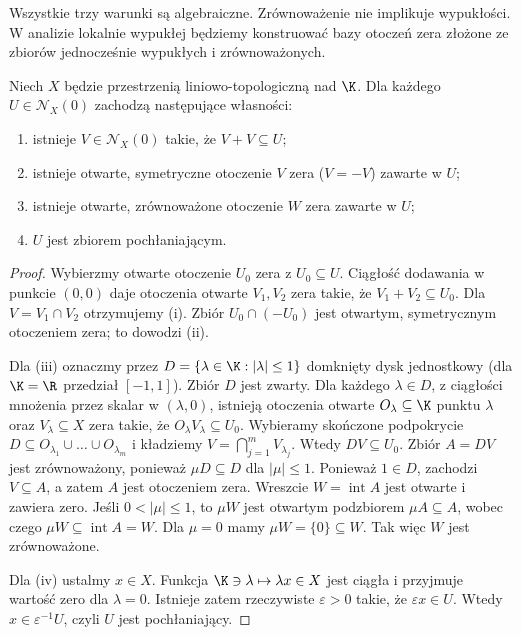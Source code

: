 \begin{uwaga}
Wszystkie trzy warunki są algebraiczne. Zrównoważenie nie
implikuje wypukłości. W analizie lokalnie wypukłej będziemy
konstruować bazy otoczeń zera złożone ze zbiorów jednocześnie
wypukłych i zrównoważonych.
\end{uwaga}

\begin{twierdzenie}\label{thm:zero-neighborhoods}
Niech $X$ będzie przestrzenią liniowo-topologiczną nad $\K$.
Dla każdego $U\in\mathcal N_X(0)$ zachodzą następujące własności:
\begin{enumerate}[label=\textup{(\roman*)}]
 \item istnieje $V\in\mathcal N_X(0)$ takie, że $V+V\subseteq U$;
 \item istnieje otwarte, symetryczne otoczenie $V$ zera
       ($V=-V$) zawarte w $U$;
 \item istnieje otwarte, zrównoważone otoczenie $W$ zera
       zawarte w $U$;
 \item $U$ jest zbiorem pochłaniającym.
\end{enumerate}
\end{twierdzenie}
\begin{proof}
Wybierzmy otwarte otoczenie $U_0$ zera z $U_0\subseteq U$.
Ciągłość dodawania w punkcie $(0,0)$ daje otoczenia otwarte
$V_1,V_2$ zera takie, że $V_1+V_2\subseteq U_0$.
Dla $V=V_1\cap V_2$ otrzymujemy (i). Zbiór
$U_0\cap(-U_0)$ jest otwartym, symetrycznym otoczeniem zera;
to dowodzi (ii).

Dla (iii) oznaczmy przez $D=\{\lambda\in\K:|\lambda|\leq1\}$
domknięty dysk jednostkowy (dla $\K=\R$ przedział $[-1,1]$).
Zbiór $D$ jest zwarty. Dla każdego $\lambda\in D$, z ciągłości
mnożenia przez skalar w $(\lambda,0)$, istnieją otoczenia otwarte
$O_\lambda\subseteq\K$ punktu $\lambda$ oraz $V_\lambda\subseteq X$
zera takie, że $O_\lambda V_\lambda\subseteq U_0$.
Wybieramy skończone podpokrycie
$D\subseteq O_{\lambda_1}\cup\dots\cup O_{\lambda_m}$ i kładziemy
$V=\bigcap_{j=1}^m V_{\lambda_j}$. Wtedy $DV\subseteq U_0$.
Zbiór $A=DV$ jest zrównoważony, ponieważ $\mu D\subseteq D$
dla $|\mu|\leq1$. Ponieważ $1\in D$, zachodzi $V\subseteq A$,
a zatem $A$ jest otoczeniem zera. Wreszcie $W=\operatorname{int}A$
jest otwarte i zawiera zero. Jeśli $0<|\mu|\leq1$, to
$\mu W$ jest otwartym podzbiorem $\mu A\subseteq A$, wobec czego
$\mu W\subseteq\operatorname{int}A=W$. Dla $\mu=0$ mamy
$\mu W=\{0\}\subseteq W$. Tak więc $W$ jest zrównoważone.

Dla (iv) ustalmy $x\in X$. Funkcja
$\K\ni\lambda\mapsto\lambda x\in X$ jest ciągła i przyjmuje
wartość zero dla $\lambda=0$. Istnieje zatem rzeczywiste
$\varepsilon>0$ takie, że $\varepsilon x\in U$.
Wtedy $x\in\varepsilon^{-1}U$, czyli $U$ jest pochłaniający.
\end{proof}

